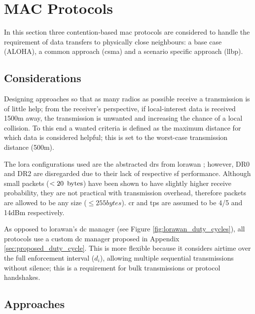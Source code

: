 \chapter{MAC Protocols}\label{sec:protocols}
In this section three contention-based \ac{mac} protocols are considered to handle the requirement of data transfers to physically close neighbours: a base case (ALOHA), a common approach (\ac{csma}) and a scenario specific approach (\ac{llbp}). 

\section{Considerations}\label{sec:mac_considerations}
Designing approaches so that as many radios as possible receive a transmission is of little help; from the receiver's perspective, if local-interest data is received 1500m away, the transmission is unwanted and increasing the chance of a local collision. To this end a wanted criteria is defined as the maximum distance for which data is considered helpful; this is set to the worst-case transmission distance (500m).

The \ac{lora} configurations used are the abstracted \ac{dr}s from \ac{lorawan} \cite{3YP:LORAWAN_REGIONAL_PARAMS}; however, DR0 and DR2 are disregarded due to their lack of respective \ac{sf} performance. Although small packets ($< 20\enskip \text{bytes}$) have been shown to have slightly higher receive probability, they are not practical with transmission overhead, therefore packets are allowed to be any size ($\leq 255 bytes$). \ac{cr} and \ac{tp}s are assumed to be 4/5 and 14dBm respectively.

As opposed to \ac{lorawan}'s \ac{dc} manager (see Figure \ref{fig:lorawan_duty_cycles}), all protocols use a custom \ac{dc} manager proposed in Appendix \ref{sec:proposed_duty_cycle}. This is  more flexible because it considers airtime over the full enforcement interval ($d_i$), allowing multiple sequential transmissions without silence; this is a requirement for bulk transmissions or protocol handshakes.

\section{Approaches}
